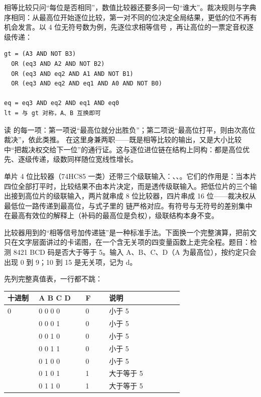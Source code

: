 相等比较只问“每位是否相同”，数值比较器还要多问一句“谁大”。裁决规则与字典序相同：从最高位开始逐位比较，第一对不同的位决定全局结果，更低的位不再有机会发言。以 4 位无符号数为例，先逐位求相等信号 ，再让高位的一票定音权逐级传递：

\begin{lstlisting}
gt = (A3 AND NOT B3)
  OR (eq3 AND A2 AND NOT B2)
  OR (eq3 AND eq2 AND A1 AND NOT B1)
  OR (eq3 AND eq2 AND eq1 AND A0 AND NOT B0)

eq = eq3 AND eq2 AND eq1 AND eq0
lt = 与 gt 对称，A、B 互换即可
\end{lstlisting}

读  的每一项：第一项说“最高位就分出胜负”；第二项说“最高位打平，则由次高位裁决”，依此类推。 在这里身兼两职——既是相等比较的输出，又是大小比较中“把裁决权交给下一位”的通行证。这与逐位进位链在结构上同构：都是高位优先、逐级传递，级数同样随位宽线性增长。

单片 4 位比较器（74HC85 一类）还带三个级联输入：、、。它们的作用是：当本片四位全部打平时，比较结果不由本片决定，而是透传级联输入。把低位片的三个输出接到高位片的级联输入，两片就串成 8 位比较器，四片串成 16 位——裁决权从最低位一路传递到最高位，与式子里的  链严格对应。有符号与无符号的差别集中在最高有效位的解释上（补码的最高位是负权），级联结构本身不变。

比较器用到的“相等信号加传递链”是一种标准手法。下面换一个完整演算，把前文只在文字层面讲过的卡诺图，在一个含无关项的四变量函数上走完全程。题目：检测 8421 BCD 码是否大于等于 5。输入 A、B、C、D（A 为最高位），按约定只会出现 0 到 9；10 到 15 是无关项，记为 d。

先列完整真值表，一行都不跳：

\begin{longtable}{L{0.16\linewidth}L{0.24\linewidth}L{0.12\linewidth}L{0.38\linewidth}}
\toprule
十进制 & A B C D & F & 说明 \\
 & 0 0 0 0 & 0 & 小于 5 \\ & 0 0 0 1 & 0 & 小于 5 \\ & 0 0 1 0 & 0 & 小于 5 \\ & 0 0 1 1 & 0 & 小于 5 \\ & 0 1 0 0 & 0 & 小于 5 \\ & 0 1 0 1 & 1 & 大于等于 5 \\ & 0 1 1 0 & 1 & 大于等于 5 \\
\bottomrule
\end{longtable}

